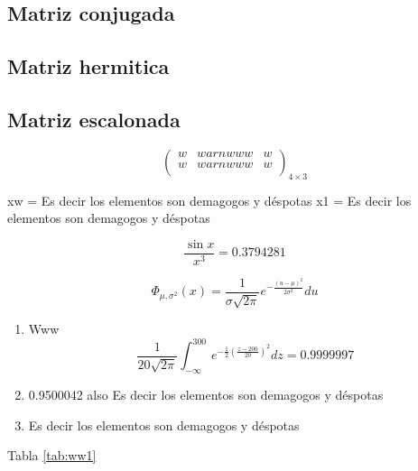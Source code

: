 \documentclass[
  11pt,
]{krantz}
\newenvironment{Shaded}{\begin{snugshade}}{\end{snugshade}}
\newcommand{\NormalTok}[1]{#1}
\newcommand{\OtherTok}[1]{\textcolor[rgb]{0.56,0.35,0.01}{#1}}
\newcommand{\StringTok}[1]{\textcolor[rgb]{0.31,0.60,0.02}{#1}}
\theoremstyle{definition}
\theoremstyle{definition}
\theoremstyle{definition}
\theoremstyle{definition}
\theoremstyle{remark}
\begin{document}
\hypertarget{matriz-conjugada}{%
\subsection{Matriz conjugada}\label{matriz-conjugada}}

\hypertarget{matriz-hermitica}{%
\subsection{Matriz hermitica}\label{matriz-hermitica}}

\hypertarget{matriz-escalonada}{%
\subsection{Matriz escalonada}\label{matriz-escalonada}}

\[
\begin{pmatrix}
 w & warnwww   & w \\
 w & warnwww   & w \\
\end{pmatrix}_{4\times 3}
\]

\begin{Shaded}
\begin{Highlighting}[]
\NormalTok{xw }\OtherTok{=} \StringTok{\textquotesingle{}Es decir los elementos son demagogos y déspotas\textquotesingle{}}
\NormalTok{x1 }\OtherTok{=} \StringTok{\textquotesingle{}Es decir los elementos son demagogos y déspotas\textquotesingle{}}
\end{Highlighting}
\end{Shaded}

\[
\frac{\sin x}{x^3}
= 0.3794281
\]

\[
\Phi_{\mu , \sigma ^{2}}(x)=\frac {1}{\sigma {\sqrt {2\pi }}}e^{-{\frac {(u-\mu )^{2}}{2\sigma ^{2}}}}du
\]

\begin{enumerate}
\def\labelenumi{\arabic{enumi}.}
\item
  Www \[\frac{1}{20\sqrt{2\pi }}\int_{-\infty }^{ 300}e^{- \frac{1}{2}\left(\frac{z-200}{20}\right)^2}dz=0.9999997\]
\item
  0.9500042 also Es decir los elementos son demagogos y déspotas
\item
  Es decir los elementos son demagogos y déspotas
\end{enumerate}

Tabla \ref{tab:ww1}
\end{document}
